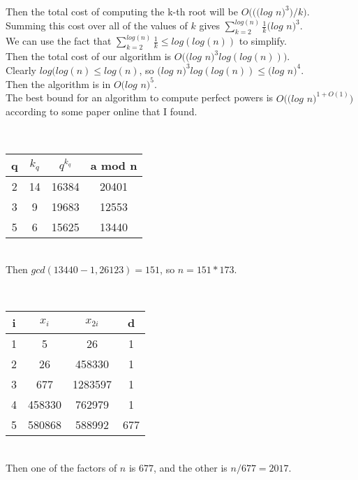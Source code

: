 \documentclass{assignment}
\begin{document}
\begin{problemlist}
\begin{answer}
  Then the total cost of computing the k-th root will be $O(((log$ $n)^3)/k)$.\\
  Summing this cost over all of the values of $k$ gives $\sum_{k=2}^{log(n)} \frac{1}{k} (log$ $n)^3$.\\
  We can use the fact that $\sum_{k=2}^{log(n)} \frac{1}{k} \le log(log(n))$ to simplify.\\
  Then the total cost of our algorithm is $O((log$ $n)^3log(log(n)))$.\\
  Clearly $log(log(n) \le log(n)$, so $(log$ $n)^3log(log(n)) \le (log$ $n)^4$.\\
  Then the algorithm is in $O(log$ $n)^5$.\\
  The best bound for an algorithm to compute perfect powers is $O((log$ $n)^{1+O(1)})$ according to some paper online that I found.
\end{answer}

\pbitem
\begin{problem}
\end{problem}
\begin{answer}
  \\
  \begin{tabular}{c|c|c|c}
    q&$k_q$&$q^{k_q}$&a mod n\\
    \hline
    2 & 14 & 16384 & 20401\\
    3 & 9 & 19683 & 12553\\
    5 & 6 & 15625 & 13440\\
  \end{tabular}
  \\Then $gcd(13440-1,26123) = 151$, so $n=151*173$.\\
\end{answer}

\pbitem
\begin{problem}
\end{problem}
\begin{answer}
  \\
  \begin{tabular}{c|c|c|c}
    i&$x_i$&$x_{2i}$&d\\
    \hline
    1 & 5 & 26 & 1\\
    2 & 26 & 458330 & 1\\
    3 & 677 & 1283597 & 1\\
    4 & 458330 & 762979 & 1\\
    5 & 580868 & 588992 & 677\\
  \end{tabular}
  \\Then one of the factors of $n$ is $677$, and the other is $n/677=2017$.\\
\end{answer}

\end{problemlist}
\end{document}
